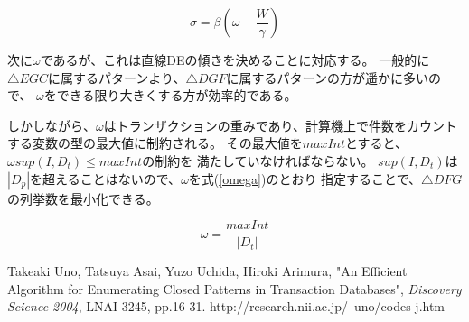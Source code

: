 \documentclass[a4paper]{jarticle}
\begin{document}
\begin{equation}
\sigma=\beta (\omega-\frac{W}{\gamma})  \label{sigma_beta}
\end{equation}



次に$\omega$であるが、これは直線DEの傾きを決めることに対応する。
一般的に$\triangle{EGC}$に属するパターンより、$\triangle{DGF}$に属するパターンの方が遥かに多いので、
$\omega$をできる限り大きくする方が効率的である。

しかしながら、$\omega$はトランザクションの重みであり、計算機上で件数をカウント
する変数の型の最大値に制約される。
その最大値を$maxInt$とすると、$\omega sup(I,D_t)\le maxInt$の制約を
満たしていなければならない。
$sup(I,D_t)$は$|D_p|$を超えることはないので、$\omega$を式(\ref{omega})のとおり
指定することで、$\triangle{DFG}$の列挙数を最小化できる。

\begin{equation}
\omega=\frac{maxInt}{|D_t|} \label{omega}
\end{equation}

\begin{thebibliography}{9}
Takeaki Uno, Tatsuya Asai, Yuzo Uchida, Hiroki Arimura, "An Efficient Algorithm for Enumerating Closed Patterns in Transaction Databases", {\it Discovery Science 2004}, LNAI 3245, pp.16-31.
http://research.nii.ac.jp/~uno/codes-j.htm
\end{thebibliography}
\end{document}
